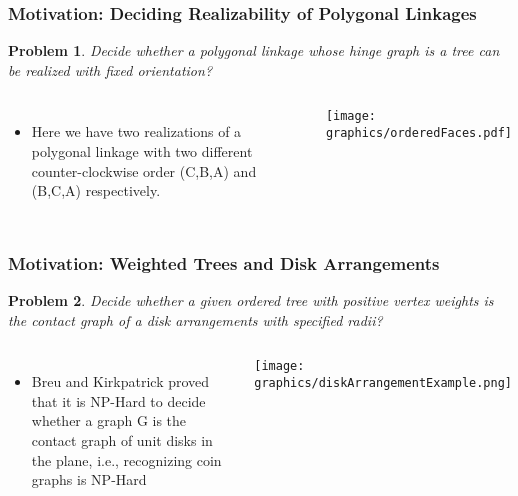 \documentclass{beamer}
\newtheorem{prob}{Problem}
\begin{document}
\begin{frame}
\frametitle{Motivation: Deciding Realizability of Polygonal Linkages}
\begin{prob}
Decide whether a polygonal linkage whose hinge graph is a \textit{tree} can be realized with \textit{fixed orientation}?
\end{prob}
\begin{columns}[c] 
   \begin{itemize}
    \item Here we have two realizations of a polygonal linkage with two different counter-clockwise order (C,B,A) and (B,C,A) respectively.  
   \end{itemize}
    \begin{minipage}{\linewidth}
        \begin{center}
			\texttt{[image: graphics/orderedFaces.pdf]}
		\end{center}
    \end{minipage}
  \end{columns}
\end{frame}

\begin{frame}
\frametitle{Motivation: Weighted Trees and Disk Arrangements}
\begin{prob}
Decide whether a given ordered tree with positive vertex weights is the contact graph of a disk arrangements with specified radii?
\end{prob}
\begin{columns}[c] %
   \begin{itemize}
    \item Breu and Kirkpatrick proved that it is NP-Hard to decide whether a graph G is the contact graph of unit disks in the plane, i.e., recognizing coin graphs is NP-Hard
   \end{itemize}
    \begin{minipage}{\linewidth}
        \begin{center}
        \texttt{[image: graphics/diskArrangementExample.png]}
        \end{center}
    \end{minipage}
  \end{columns}
\end{frame}
\end{document}
